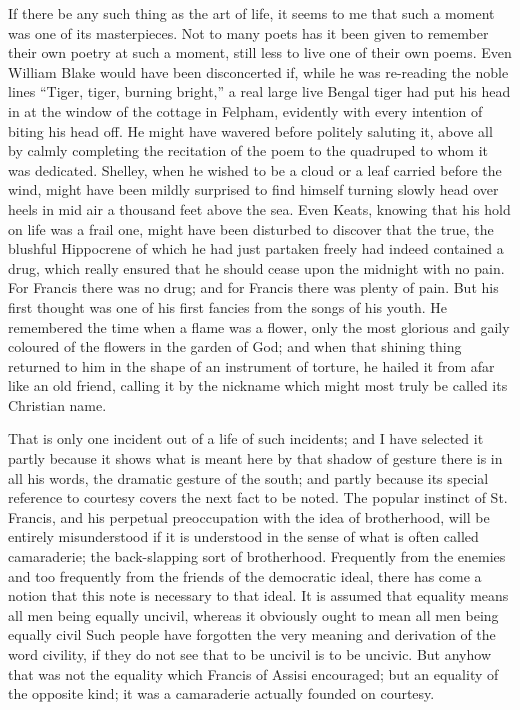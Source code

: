 \documentclass{book}
\begin{document}
If there be any such thing as the art of life, it seems to me that such a moment was one of its masterpieces. Not to many poets has it been given to remember their own poetry at such a moment, still less to live one of their own poems. Even William Blake would have been disconcerted if, while he was re-reading the noble lines “Tiger, tiger, burning bright,” a real large live Bengal tiger had put his head in at the window of the cottage in Felpham, evidently with every intention of biting his head off. He might have wavered before politely saluting it, above all by calmly completing the recitation of the poem to the quadruped to whom it was dedicated. Shelley, when he wished to be a cloud or a leaf carried before the wind, might have been mildly surprised to find himself turning slowly head over heels in mid air a thousand feet above the sea. Even Keats, knowing that his hold on life was a frail one, might have been disturbed to discover that the true, the blushful Hippocrene of which he had just partaken freely had indeed contained a drug, which really ensured that he should cease upon the midnight with no pain. For Francis there was no drug; and for Francis there was plenty of pain. But his first thought was one of his first fancies from the songs of his youth. He remembered the time when a flame was a flower, only the most glorious and gaily coloured of the flowers in the garden of God; and when that shining thing returned to him in the shape of an instrument of torture, he hailed it from afar like an old friend, calling it by the nickname which might most truly be called its Christian name.

That is only one incident out of a life of such incidents; and I have selected it partly because it shows what is meant here by that shadow of gesture there is in all his words, the dramatic gesture of the south; and partly because its special reference to courtesy covers the next fact to be noted. The popular instinct of St. Francis, and his perpetual preoccupation with the idea of brotherhood, will be entirely misunderstood if it is understood in the sense of what is often called camaraderie; the back-slapping sort of brotherhood. Frequently from the enemies and too frequently from the friends of the democratic ideal, there has come a notion that this note is necessary to that ideal. It is assumed that equality means all men being equally uncivil, whereas it obviously ought to mean all men being equally civil Such people have forgotten the very meaning and derivation of the word civility, if they do not see that to be uncivil is to be uncivic. But anyhow that was not the equality which Francis of Assisi encouraged; but an equality of the opposite kind; it was a camaraderie actually founded on courtesy.
\end{document}

